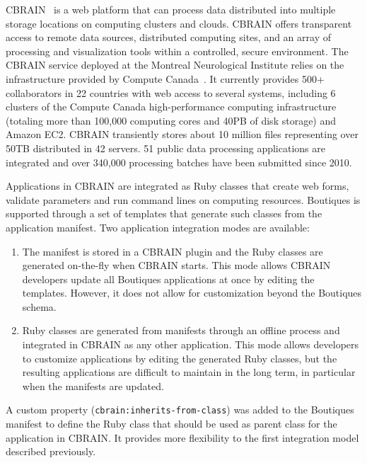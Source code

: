 \documentclass{article}
\newcommand{\boutiques}{Boutiques\xspace}
\begin{document}
CBRAIN~\cite{SHER-14} is a web platform that can process data
distributed into multiple storage locations on computing clusters and
clouds. CBRAIN offers transparent access to remote data sources,
distributed computing sites, and an array of processing and
visualization tools within a controlled, secure environment.  The
CBRAIN service deployed at the Montreal Neurological Institute relies
on the infrastructure provided by Compute Canada~\cite{das2016mni}. It
currently provides 500+ collaborators in 22 countries with web access
to several systems, including 6 clusters of the Compute Canada
high-performance computing infrastructure (totaling more than 100,000
computing cores and 40PB of disk storage) and Amazon EC2. CBRAIN
transiently stores about 10 million files representing over 50TB
distributed in 42 servers. 51 public data processing applications are
integrated and over 340,000 processing batches have been submitted since 2010.

Applications in CBRAIN are integrated as Ruby classes that create web
forms, validate parameters and run command lines on computing
resources. \boutiques is supported through a set of templates that
generate such classes from the application manifest. Two application
integration modes are available:
\begin{enumerate}
  \item The manifest is stored in a CBRAIN plugin and the Ruby classes
    are generated on-the-fly when CBRAIN starts. This mode allows
    CBRAIN developers update all \boutiques applications at once by
    editing the templates. However, it does not allow for
    customization beyond the \boutiques schema.
  \item Ruby classes are generated from manifests
    through an offline process and integrated in CBRAIN as any other
    application. This mode allows developers to customize applications
    by editing the generated Ruby classes, but the resulting
    applications are difficult to maintain in the long term, in
    particular when the manifests are updated.
\end{enumerate}

A custom property (\texttt{cbrain:inherits-from-class}) was added to
the \boutiques manifest to define the Ruby class that should be used as
parent class for the application in CBRAIN. It provides more
flexibility to the first integration model described previously.
\end{document}
